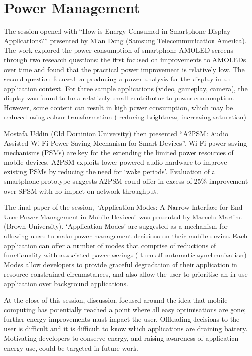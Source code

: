 \section{Power Management}
\label{sec:power}
The session %
opened with
``How is Energy Consumed in Smartphone Display Applications?'' presented by Mian Dong (Samsung Telecommunication America). The work explored
the power consumption of smartphone AMOLED screens through two research questions: the first focused on improvements to AMOLEDs over time
and found that the practical power improvement is relatively low.
The second question focused on 
producing a power analysis for the display in an application context. For three 
sample applications (video, gameplay, camera), the display was found to be a 
relatively small contributor to power consumption. However, some content can result in high power consumption, which may be reduced using colour 
transformation (\eg{} reducing brightness, increasing saturation).

Mostafa Uddin (Old Dominion University) then presented ``A2PSM: Audio Assisted 
Wi-Fi Power Saving Mechanism for Smart Devices''. Wi-Fi power saving mechanisms 
(PSMs) are key for the extending the limited power resources of mobile devices. 
A2PSM exploits lower-powered audio hardware to 
improve existing PSMs by reducing the need for `wake periods'. 
Evaluation of a smartphone prototype suggests A2PSM could offer in excess of 25\%
improvement over SPSM with no impact on network throughput.

The final paper of the session, ``Application Modes: A Narrow Interface for End-
User Power Management in Mobile Devices'' was presented by Marcelo Martins (Brown 
University). `Application Modes' are suggested as a mechanism for allowing 
users to make power management decisions on their mobile device. Each 
application can offer a number of modes that comprise of reductions of 
functionality with associated power savings (\eg{} turn off automatic 
synchronisation). Modes allow developers to provide graceful degradation of their 
application in resource-constrained circumstances, and also allow the user to 
prioritise an in-use application over background applications.

At the close of this session, discussion focused around the idea
that mobile computing has potentially reached a point where all easy 
optimisations are gone; further energy improvements must impact the 
user. Offloading decisions to the user is difficult and it is difficult to 
know which applications are draining battery. Motivating 
developers to conserve energy, and raising awareness of application energy use, 
could be targeted in future work. %
